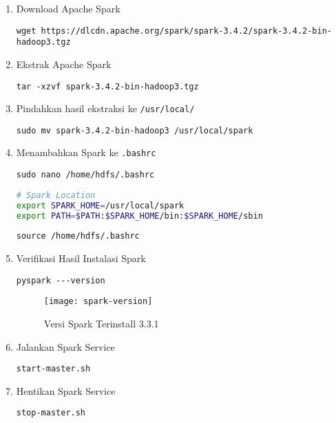 \documentclass[a4paper]{tufte-handout}
\begin{document}
\begin{enumerate}
\item Download Apache Spark
\begin{lstlisting}[language=Terminal]
 wget https://dlcdn.apache.org/spark/spark-3.4.2/spark-3.4.2-bin-hadoop3.tgz
\end{lstlisting}

\item Ekstrak Apache Spark
\begin{lstlisting}[language=Terminal]
 tar -xzvf spark-3.4.2-bin-hadoop3.tgz
\end{lstlisting}

\item Pindahkan hasil ekstraksi ke {\tt /usr/local/}
\begin{lstlisting}[language=Terminal]
 sudo mv spark-3.4.2-bin-hadoop3 /usr/local/spark
\end{lstlisting} 

\item Menambahkan Spark ke {\tt .bashrc}
\begin{lstlisting}[language=Terminal]
 sudo nano /home/hdfs/.bashrc
\end{lstlisting} 
\begin{lstlisting}[language=Bash, label={lst:bash-spark}, caption=Code Konfig Apaceh Spark]
# Spark Location
export SPARK_HOME=/usr/local/spark
export PATH=$PATH:$SPARK_HOME/bin:$SPARK_HOME/sbin
\end{lstlisting}
\begin{lstlisting}[language=Terminal]
 source /home/hdfs/.bashrc
\end{lstlisting}

\item Verifikasi Hasil Instalasi Spark
\begin{lstlisting}[language=Terminal]
 pyspark ---version
\end{lstlisting}

\begin{figure}[!ht]
\texttt{[image: spark-version]}
\caption{Versi Spark Terinstall 3.3.1 }
\label{gam:form-ssh}
\end{figure}

\item Jalankan Spark Service
\begin{lstlisting}[language=Terminal]
 start-master.sh
\end{lstlisting}

\item Hentikan Spark Service
\begin{lstlisting}[language=Terminal]
 stop-master.sh
\end{lstlisting} 
\end{enumerate}
\end{document}
